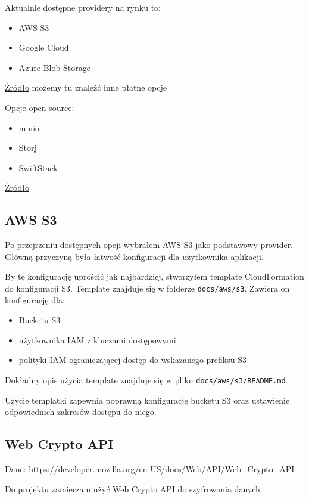 \documentclass[11pt, a4paper]{article}
\begin{document}
Aktualnie dostępne providery na rynku to:
\begin{itemize}
    \item AWS S3
    \item Google Cloud 
    \item Azure Blob Storage
\end{itemize}
\href{https://www.digitalocean.com/resources/articles/amazon-s3-alternatives}{Źródło} możemy tu znaleźć inne płatne opcje

Opcje open source:
\begin{itemize}
    \item minio
    \item Storj
    \item SwiftStack
\end{itemize}
\href{https://opensourcealternative.to/alternativesto/amazon-s3}{Źródło}

\subsection{AWS S3}

Po przejrzeniu dostępnych opcji wybrałem AWS S3 jako podstawowy provider.
Główną przyczyną była łatwość konfiguracji dla użytkownika aplikacji.

By tę konfigurację uprościć jak najbardziej, stworzyłem template CloudFormation do konfiguracji S3.
Template znajduje się w folderze \texttt{docs/aws/s3}.
Zawiera on konfigurację dla:
\begin{itemize}
    \item Bucketu S3 
    \item użytkownika IAM z kluczami dostępowymi
    \item polityki IAM ograniczającej dostęp do wskazanego prefiksu S3
\end{itemize}

Dokładny opis użycia template znajduje się w pliku \texttt{docs/aws/s3/README.md}.

Użycie templatki zapewnia poprawną konfigurację bucketu S3 oraz ustawienie odpowiednich zakresów dostępu do niego.

\newpage

\subsection{Web Crypto API}
Dane: \url{https://developer.mozilla.org/en-US/docs/Web/API/Web_Crypto_API}

Do projektu zamierzam użyć Web Crypto API do szyfrowania danych.
\end{document}
